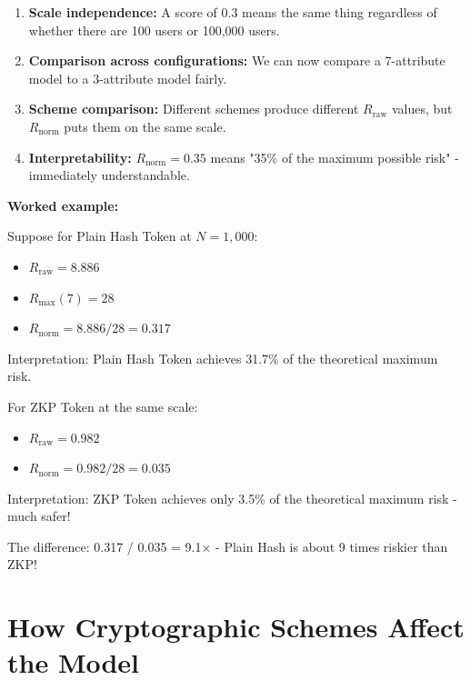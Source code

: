 \documentclass[12pt,a4paper,oneside,openany]{report}
\begin{document}
\begin{enumerate}
    \item \textbf{Scale independence:} A score of 0.3 means the same thing regardless of whether there are 100 users or 100,000 users.
    
    \item \textbf{Comparison across configurations:} We can now compare a 7-attribute model to a 3-attribute model fairly.
    
    \item \textbf{Scheme comparison:} Different schemes produce different $R_{\mathrm{raw}}$ values, but $R_{\mathrm{norm}}$ puts them on the same scale.
    
    \item \textbf{Interpretability:} $R_{\mathrm{norm}} = 0.35$ means "35\% of the maximum possible risk" - immediately understandable.
\end{enumerate}

\textbf{Worked example:}

Suppose for Plain Hash Token at $N = 1,000$:
\begin{itemize}
    \item $R_{\mathrm{raw}} = 8.886$
    \item $R_{\mathrm{max}}(7) = 28$
    \item $R_{\mathrm{norm}} = 8.886 / 28 = 0.317$
\end{itemize}

Interpretation: Plain Hash Token achieves 31.7\% of the theoretical maximum risk.

For ZKP Token at the same scale:
\begin{itemize}
    \item $R_{\mathrm{raw}} = 0.982$
    \item $R_{\mathrm{norm}} = 0.982 / 28 = 0.035$
\end{itemize}

Interpretation: ZKP Token achieves only 3.5\% of the theoretical maximum risk - much safer!

The difference: 0.317 / 0.035 = 9.1× - Plain Hash is about 9 times riskier than ZKP!

\chapter{How Cryptographic Schemes Affect the Model}
\label{chap:schemes}
\end{document}
